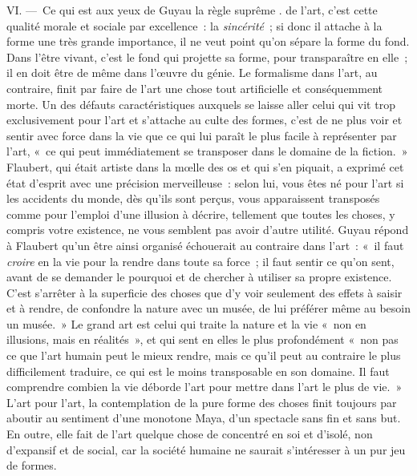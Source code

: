 \documentclass[french,twoside]{book} %
\begin{document}
VI. — Ce qui est aux yeux de Guyau la règle suprême . de l’art, c’est cette qualité morale et sociale par excellence : la \emph{sincérité} ; si donc il attache à la forme une très grande importance, il ne veut point qu’on sépare la forme du fond. Dans l’être vivant, c’est le fond qui projette sa forme, pour transparaître en elle ; il en doit être de même dans l’œuvre du génie. Le formalisme dans l’art, au contraire, finit par faire de l’art une chose tout artificielle et conséquemment morte. Un des défauts caractéristiques auxquels se laisse aller celui qui vit trop exclusivement pour l’art et s’attache au culte des formes, c’est de ne plus voir et sentir avec force dans la vie que ce qui lui paraît le plus facile à représenter par l’art, « ce qui peut immédiatement se transposer dans le domaine de la fiction. » Flaubert, qui était artiste dans la mœlle des os et qui s’en piquait, a exprimé cet état d’esprit avec une précision merveilleuse : selon lui, vous êtes né pour l’art si les accidents du monde, dès qu’ils sont perçus, vous apparaissent transposés comme pour l’emploi d’une illusion à décrire, tellement que toutes les choses, y compris votre existence, ne vous semblent pas avoir d’autre utilité. Guyau répond à Flaubert qu’un être ainsi organisé échouerait au contraire dans l’art : « il faut \emph{croire} en la vie pour la rendre dans toute sa force ; il faut sentir ce qu’on sent, avant de se demander le pourquoi et de chercher à utiliser sa propre existence. C’est s’arrêter à la superficie des choses que d’y voir seulement des effets à saisir et à rendre, de confondre la nature avec un musée, de lui préférer même au besoin un musée. » Le grand art est celui qui traite la nature et la vie « non en illusions, mais en réalités », et qui sent en elles le plus profondément « non pas ce que l’art humain peut le mieux rendre, mais ce qu’il peut au contraire le plus difficilement traduire, ce qui est le moins transposable en son domaine. Il faut comprendre combien la vie déborde l’art pour mettre dans l’art le plus de vie. » L’art pour l’art, la contemplation de la pure forme des choses finit toujours par aboutir au sentiment d’une monotone Maya, d’un spectacle sans fin et sans but. En outre, elle fait de l’art quelque chose de concentré en soi et d’isolé, non d’expansif et de social, car la société humaine ne saurait s’intéresser à un pur jeu de formes.\par
\end{document}
